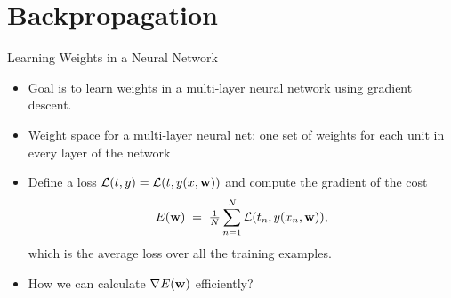\documentclass[handout,aspectratio=169]{beamer}
\begin{document}
\section{Backpropagation}

\begin{frame}{Learning Weights in a Neural Network}

\begin{itemize}
\item Goal is to learn weights in a multi-layer neural network 
using gradient descent.
\medskip

\item Weight space for a multi-layer neural net: one set of weights for each unit in every layer of the network
\medskip

\item Define a loss ${\cal L}(t,y)={\cal L}(t,y(x,{\bf w}))$ and compute the gradient of the cost $$E({\bf w})\;=\;\tfrac1N\sum_{n=1}^N {\cal L}(t_n,y(x_n,{\bf w})),$$
which is the average loss over all the training examples.
\medskip

\item How we can calculate $\nabla E ( {\bf w})$ efficiently?
\end{itemize}
\end{frame}
\end{document}
